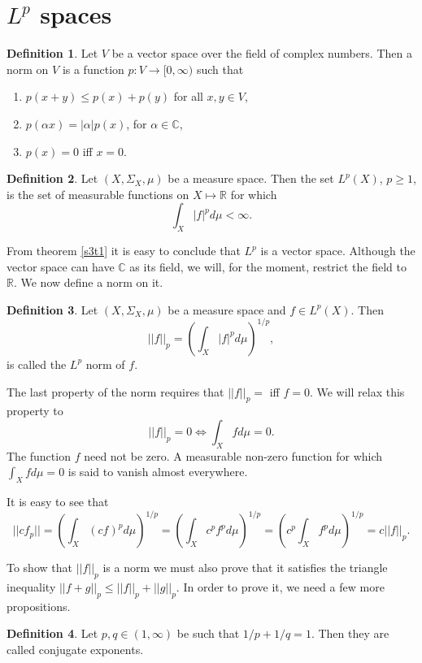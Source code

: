\documentclass{article}
\newcommand{\soc}{\mathbb{C}}
\newcommand{\sor}{\mathbb{R}}
\theoremstyle{plain}
\numberwithin{thm}{section}
\theoremstyle{plain}
\numberwithin{prop}{section}
\theoremstyle{definition}
\newtheorem{defn}{Definition}
\numberwithin{defn}{section}
\theoremstyle{remark}
\theoremstyle{plain}
\numberwithin{cor}{section}
\numberwithin{equation}{section}
\begin{document}
\section{$L^p$ spaces}\label{s5}
\begin{defn}\label{s5d1}Let $V$ be a vector space over the field of 
complex numbers. Then a norm on $V$ is a function $p: V \rightarrow 
[0, \infty)$ such that
\begin{enumerate}
\item $p(x + y) \le p(x) + p(y)$ for all $x, y \in V$,
\item $p(\alpha x) = |\alpha|p(x)$, for $\alpha \in \soc$,
\item $p(x) = 0$ iff $x = 0$.
\end{enumerate}
\end{defn}

\begin{defn}\label{s5d2}
Let $(X, \Sigma_X, \mu)$ be a measure space. Then the set $L^p(X)$, $p \ge
1$, is the set of measurable functions on $X \mapsto \sor$ for which
\[
\int_X |f|^p d\mu < \infty.
\]
\end{defn}

From theorem \ref{s3t1} it is easy to conclude that $L^p$ is a vector
space. Although the vector space can have $\soc$ as its field, we will, for
the moment, restrict the field to $\sor$. We now define a norm on it.
\begin{defn}\label{s2d2}
Let $(X, \Sigma_X, \mu)$ be a measure space and $f \in L^p(X)$. Then
\[
||f||_p = \left(\int_X |f|^p d\mu\right)^{1/p},
\]
is called the $L^p$ norm of $f$.
\end{defn}
The last property of the norm requires that $||f||_p = $ iff $f = 0$.
We will relax this property to
\begin{equation}\label{s5e1}
||f||_p = 0 \Leftrightarrow \int_X fd\mu = 0.
\end{equation}
The function $f$ need not be zero. A measurable non-zero function for 
which $\int_X fd\mu = 0$ is said to vanish almost everywhere. 

It is easy to see that
\[
||cf_p|| = \left(\int_X (cf)^p d\mu\right)^{1/p} =
\left(\int_X c^p f^p d\mu\right)^{1/p} = 
\left(c^p \int_X f^p d\mu\right)^{1/p} = c||f||_p.
\]

To show that $||f||_p$ is a norm we must also prove that it satisfies
the triangle inequality $||f + g||_p \le ||f||_p + ||g||_p$. In order
to prove it, we need a few more propositions.

\begin{defn}
Let $p, q \in (1, \infty)$ be such that $1/p + 1/q = 1$. Then they are
called conjugate exponents.
\end{defn}
\end{document}
